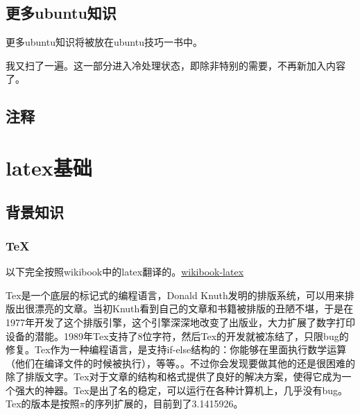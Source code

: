 \documentclass[12pt,oneside]{book}
\begin{document}
\begin{common-format}
\section{更多ubuntu知识}
更多ubuntu知识将被放在ubuntu技巧一书中。

我又扫了一遍。这一部分进入冷处理状态，即除非特别的需要，不再新加入内容了。


\section{注释}
\showendnotes



\chapter{latex基础}
\section{背景知识}
\subsection{TeX}
以下完全按照wikibook中的latex翻译的。\href{http://en.wikibooks.org/wiki/LaTeX/Introduction}{wikibook-latex}

Tex是一个底层的标记式的编程语言，Donald Knuth发明的排版系统，可以用来排版出很漂亮的文章。当初Knuth看到自己的文章和书籍被排版的丑陋不堪，于是在1977年开发了这个排版引擎，这个引擎深深地改变了出版业，大力扩展了数字打印设备的潜能。1989年Tex支持了8位字符，然后Tex的开发就被冻结了，只限bug的修复。Tex作为一种编程语言，是支持if-else结构的：你能够在里面执行数学运算（他们在编译文件的时候被执行），等等。。不过你会发现要做其他的还是很困难的除了排版文字。Tex对于文章的结构和格式提供了良好的解决方案，使得它成为一个强大的神器。Tex是出了名的稳定，可以运行在各种计算机上，几乎没有bug。Tex的版本是按照$\pi$的序列扩展的，目前到了3.1415926。


\end{common-format}
\end{document}
